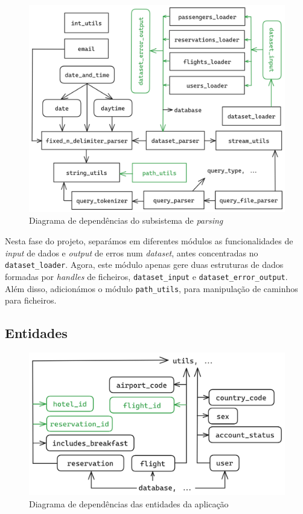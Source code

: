 \documentclass[11pt, a4paper]{article}
\begin{document}
\begin{figure}[ht]
    \centering
    \includegraphics[scale=0.16]{res-fase2/parsing.png}
    \caption{Diagrama de dependências do subsistema de \emph{parsing}}
    \label{fig:parsing}
\end{figure}

Nesta fase do projeto, separámos em diferentes módulos as funcionalidades de \emph{input} de dados
e \emph{output} de erros num \emph{dataset}, antes concentradas no \texttt{dataset\_loader}. Agora,
este módulo apenas gere duas estruturas de dados formadas por \emph{handles} de ficheiros,
\texttt{dataset\_input} e \texttt{dataset\_error\_output}. Além disso, adicionámos o módulo
\texttt{path\_utils}, para manipulação de caminhos para ficheiros.

\subsection{Entidades}
\label{sec:entities}

\begin{figure}[H]
    \centering
    \includegraphics[scale=0.16]{res-fase2/entities.png}
    \caption{Diagrama de dependências das entidades da aplicação}
    \label{fig:entities}
\end{figure}
\end{document}
